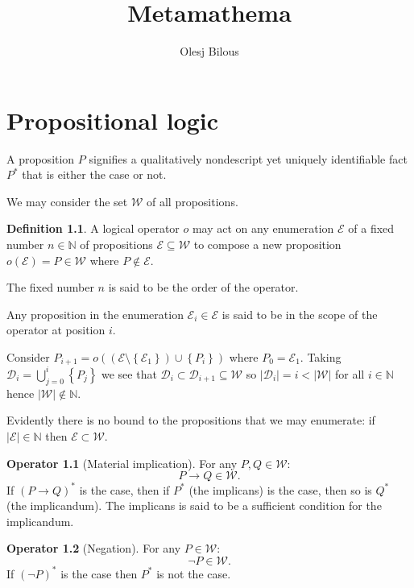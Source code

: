 \documentclass{amsbook}
\newcommand{\setsm}[1]{\left\{#1\right\}}
\newcommand{\wffs}{\mathcal W}
\theoremstyle{definition}
\newtheorem{op}{Operator}[section]
\newtheorem{dfn}{Definition}[section]
\begin{document}
\title{Metamathema}
\author{Olesj Bilous}
\maketitle

\chapter{Propositional logic}

A proposition $P$ signifies a qualitatively nondescript yet uniquely identifiable fact $P^*$ that is either the case or not.

We may consider the set $\mathcal W$ of all propositions.

\begin{dfn}
    A logical operator $o$ may act on any enumeration $\mathcal E$ of a fixed number $n \in \mathbb N$ of propositions $\mathcal E \subseteq \mathcal W$ to compose a new proposition $o(\mathcal E) = P \in \mathcal W$ where $P \notin \mathcal E$.

    The fixed number $n$ is said to be the order of the operator.

    Any proposition in the enumeration $\mathcal E_i \in \mathcal E$ is said to be in the scope of the operator at position $i$.
\end{dfn}

Consider $P_{i+1} = o((\mathcal E \setminus \setsm {\mathcal E_1}) \cup \setsm {P_i})$ where $P_0 = \mathcal E_1$. Taking $\mathcal D_i = \bigcup_{j=0}^i \setsm {P_j}$ we see that $\mathcal D_i \subset \mathcal D_{i+1} \subseteq \wffs$ so $|\mathcal D_i| = i < |\mathcal W|$ for all $i \in \mathbb N$ hence $|\mathcal W| \notin \mathbb N$.

Evidently there is no bound to the propositions that we may enumerate: if $|\mathcal E| \in \mathbb N$ then $\mathcal E \subset \mathcal W$.

\begin{op}[Material implication]
    For any $P, Q \in \wffs$:
    $$
        P \rightarrow Q \in \wffs.
    $$
    If $(P \rightarrow Q)^*$ is the case, then if $P^*$ (the implicans) is the case, then so is $Q^*$ (the implicandum). The implicans is said to be a sufficient condition for the implicandum.
\end{op}

\begin{op}[Negation]
    For any $P \in \wffs$:
    $$
        \neg P \in \wffs.
    $$
    If $(\neg P)^*$ is the case then $P^*$ is not the case.
\end{op}
\end{document}
